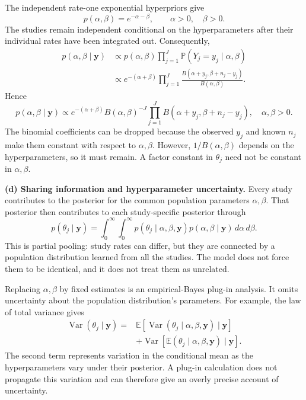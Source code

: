 \documentclass[11pt,a4paper]{article}
\newcommand{\E}{\mathbb{E}}
\begin{document}
The independent rate-one exponential hyperpriors give
\[
p(\alpha,\beta)=e^{-\alpha-\beta},\qquad \alpha>0,\quad\beta>0.
\]
The studies remain independent conditional on the hyperparameters after
their individual rates have been integrated out. Consequently,
\[
\begin{aligned}
p(\alpha,\beta\mid\mathbf y)
&\propto p(\alpha,\beta)
\prod_{j=1}^{J}\mathbb{P}(Y_j=y_j\mid\alpha,\beta)\\
&\propto e^{-(\alpha+\beta)}
\prod_{j=1}^{J}
\frac{B(\alpha+y_j,\beta+n_j-y_j)}{B(\alpha,\beta)}.
\end{aligned}
\]
Hence
\[
\boxed{
p(\alpha,\beta\mid\mathbf y)
\propto e^{-(\alpha+\beta)}B(\alpha,\beta)^{-J}
\prod_{j=1}^{J}B(\alpha+y_j,\beta+n_j-y_j),
\quad \alpha,\beta>0.
}
\]
The binomial coefficients can be dropped because the observed $y_j$ and
known $n_j$ make them constant with respect to $\alpha,\beta$.
However, $1/B(\alpha,\beta)$ depends on the hyperparameters, so it must
remain. A factor constant in $\theta_j$ need not be constant in
$\alpha,\beta$.

\textbf{(d) Sharing information and hyperparameter uncertainty.}
Every study contributes to the posterior for the common population
parameters $\alpha,\beta$. That posterior then contributes to each
study-specific posterior through
\[
p(\theta_j\mid\mathbf y)
=\int_0^\infty\!\int_0^\infty
p(\theta_j\mid\alpha,\beta,\mathbf y)
p(\alpha,\beta\mid\mathbf y)\,d\alpha\,d\beta.
\]
This is partial pooling: study rates can differ, but they are connected by
a population distribution learned from all the studies. The model does not
force them to be identical, and it does not treat them as unrelated.

Replacing $\alpha,\beta$ by fixed estimates is an empirical-Bayes plug-in
analysis. It omits uncertainty about the population distribution's parameters.
For example, the law of total variance gives
\[
\begin{aligned}
\operatorname{Var}(\theta_j\mid\mathbf y)
={}&\E\!\left[
\operatorname{Var}(\theta_j\mid\alpha,\beta,\mathbf y)
\mid\mathbf y\right]\\
&+\operatorname{Var}\!\left[
\E(\theta_j\mid\alpha,\beta,\mathbf y)
\mid\mathbf y\right].
\end{aligned}
\]
The second term represents variation in the conditional mean as the
hyperparameters vary under their posterior. A plug-in calculation does not
propagate this variation and can therefore give an overly precise account
of uncertainty.
\end{document}

